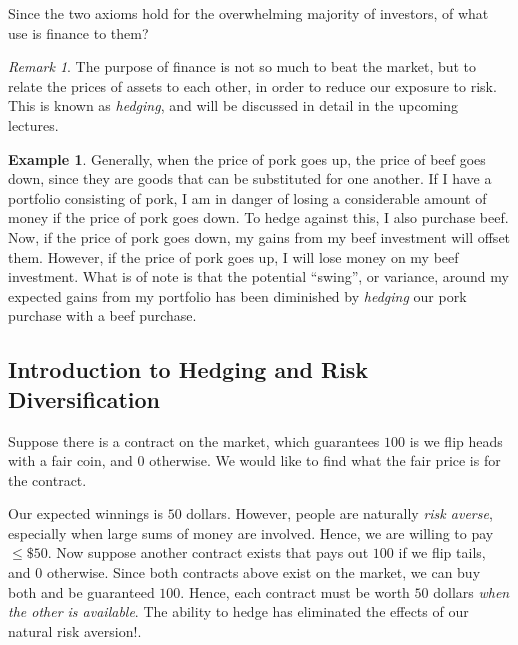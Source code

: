 \documentclass[12pt]{article}
\theoremstyle{plain}
\theoremstyle{definition}
\newtheorem*{example}{Example}
\theoremstyle{remark}
\newtheorem*{remark}{Remark}
\numberwithin{equation}{section}  %
\begin{document}
Since the two axioms hold for the overwhelming majority of investors, of what 
use
is finance to them? 
\begin{remark}
	The purpose of finance is not so much to beat the market,
	but to relate the prices of assets to each other, in order to reduce our 
	exposure to risk. This is known as \emph{hedging}, and will be discussed in 
	detail in the upcoming lectures.  
\end{remark}
\begin{example}
	Generally, when the price of pork goes up, the price of beef goes down, 
	since
	they are goods that can be substituted for one another. If I have a 
	portfolio
	consisting of pork, I am in danger of losing a considerable amount of money
	if the price of pork goes down. To hedge against this, I also purchase beef.
	Now, if the price of pork goes down, my gains from my beef investment will
	offset them. However, if the price of pork goes up, I will lose money on my
	beef investment. What is of note is that the potential ``swing'', or
	variance, around my expected gains from my portfolio has been diminished by
	\emph{hedging} our pork purchase with a beef purchase.
\end{example}
\subsection{Introduction to Hedging and Risk Diversification}
Suppose there is a contract on the market, which guarantees $100$ is we flip 
heads with a fair coin, and $0$ otherwise. We would like to find what the fair 
price is for the contract. 

Our expected winnings is $50$ dollars. However, people are naturally \emph{risk 
	averse}, especially when large sums of money are involved. Hence, we are 
willing to pay $\le \$50$. Now suppose another contract exists that pays out 
$100$ if we flip tails, and $0$ otherwise. Since both contracts above exist on 
the market, we can buy both and be guaranteed $100$. Hence, each contract must 
be worth $50$ dollars \emph{when the other is available}.  The ability to hedge 
has eliminated the effects of our natural risk aversion!. 
\end{document}
